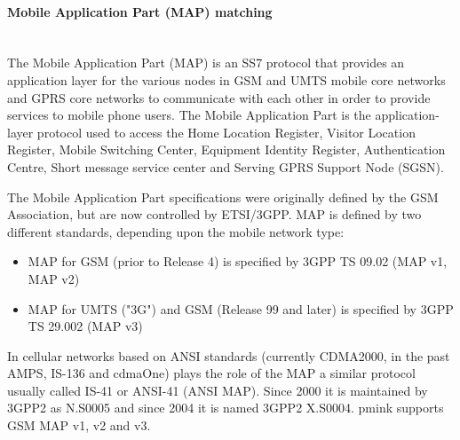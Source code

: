 \documentclass[a4paper,latin]{paper}
\begin{document}
\paragraph{Mobile Application Part (MAP) matching}
\mbox{}\\
The Mobile Application Part (MAP) is an SS7 protocol that provides an application layer for the various nodes in GSM and UMTS mobile core networks and GPRS core 
networks to communicate with each other in order to provide services to mobile phone users. The Mobile Application Part is the application-layer protocol used 
to access the Home Location Register, Visitor Location Register, Mobile Switching Center, Equipment Identity Register, Authentication Centre, Short message 
service center and Serving GPRS Support Node (SGSN).

The Mobile Application Part specifications were originally defined by the GSM Association, but are now controlled by ETSI/3GPP. MAP is defined by two different 
standards, depending upon the mobile network type:
\begin{itemize}
  \setlength{\itemsep}{0pt}
  \setlength{\parskip}{0pt}
  \setlength{\parsep}{0pt}
  \item MAP for GSM (prior to Release 4) is specified by 3GPP TS 09.02 (MAP v1, MAP v2)
  \item MAP for UMTS ("3G") and GSM (Release 99 and later) is specified by 3GPP TS 29.002 (MAP v3)
\end{itemize}

In cellular networks based on ANSI standards (currently CDMA2000, in the past AMPS, IS-136 and cdmaOne) plays the role of the MAP a similar protocol usually called 
IS-41 or ANSI-41 (ANSI MAP). Since 2000 it is maintained by 3GPP2 as N.S0005 and since 2004 it is named 3GPP2 X.S0004. \acrfull{pmink} supports GSM MAP v1, v2 and v3.
\clearpage
\end{document}
